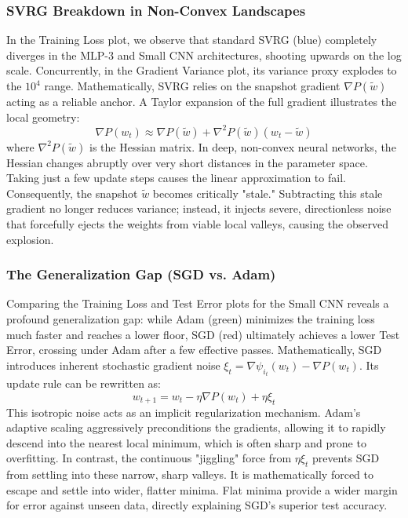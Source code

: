 \documentclass[11pt,a4paper]{article}
\begin{document}
\subsubsection{SVRG Breakdown in Non-Convex Landscapes}
In the Training Loss plot, we observe that standard SVRG (blue) completely diverges in the MLP-3 and Small CNN architectures, shooting upwards on the log scale. Concurrently, in the Gradient Variance plot, its variance proxy explodes to the $10^4$ range. Mathematically, SVRG relies on the snapshot gradient $\nabla P(\tilde{w})$ acting as a reliable anchor. A Taylor expansion of the full gradient illustrates the local geometry:
\begin{equation}
\nabla P(w_t) \approx \nabla P(\tilde{w}) + \nabla^2 P(\tilde{w})(w_t - \tilde{w})
\end{equation}
where $\nabla^2 P(\tilde{w})$ is the Hessian matrix. In deep, non-convex neural networks, the Hessian changes abruptly over very short distances in the parameter space. Taking just a few update steps causes the linear approximation to fail. Consequently, the snapshot $\tilde{w}$ becomes critically "stale." Subtracting this stale gradient no longer reduces variance; instead, it injects severe, directionless noise that forcefully ejects the weights from viable local valleys, causing the observed explosion.

\subsubsection{The Generalization Gap (SGD vs. Adam)}
Comparing the Training Loss and Test Error plots for the Small CNN reveals a profound generalization gap: while Adam (green) minimizes the training loss much faster and reaches a lower floor, SGD (red) ultimately achieves a lower Test Error, crossing under Adam after a few effective passes. Mathematically, SGD introduces inherent stochastic gradient noise $\xi_t = \nabla \psi_{i_t}(w_t) - \nabla P(w_t)$. Its update rule can be rewritten as:
\begin{equation}
w_{t+1} = w_t - \eta \nabla P(w_t) + \eta \xi_t
\end{equation}
This isotropic noise acts as an implicit regularization mechanism. Adam's adaptive scaling aggressively preconditions the gradients, allowing it to rapidly descend into the nearest local minimum, which is often sharp and prone to overfitting. In contrast, the continuous "jiggling" force from $\eta \xi_t$ prevents SGD from settling into these narrow, sharp valleys. It is mathematically forced to escape and settle into wider, flatter minima. Flat minima provide a wider margin for error against unseen data, directly explaining SGD's superior test accuracy.
\end{document}
